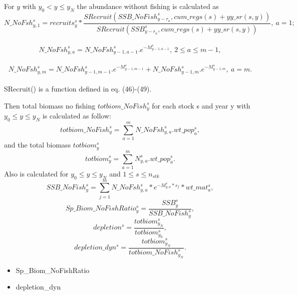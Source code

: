\documentclass{article}
\begin{document}
For $y$ with $y_0 < y \leq y_N$ the abundance without fishing is calculated as 
\\
\begin{equation}
    N\_NoFsh^s_{y,1}=recruits^s_y*\dfrac{SRecruit(SSB\_NoFish^s_{y-r_a},cum\_regs(s)+yy\_sr(s,y))}{SRecruit(SSB^s_{y-r_a},cum\_regs(s)+yy\_sr(s,y))}, \ a=1;
\end{equation}
\\
\begin{equation}
    N\_NoFsh^s_{y,a}=N\_NoFsh^s_{y-1,a-1}.e^{-M^s_{y-1, a-1}}, \ 2\leq a \leq m-1, 
\end{equation}
\\
\begin{equation}
    N\_NoFsh^s_{y,m}=N\_NoFsh^s_{y-1,m-1}.e^{-M^s_{y-1,m-1}}+N\_NoFsh^s_{y-1,m}.e^{-M^s_{y-1,m}}, \ a=m.
\end{equation}
\\
SRecruit() is a function defined in eq. (46)-(49).

Then total biomass no fishing  $totbiom\_NoFish^s_y$  for each stock s and year y with $y_0 \leq y \leq y_N$ is calculated as follow:
\begin{equation}
    totbiom\_NoFish^s_y=\sum_{a=1}^m N\_NoFsh^s_{y,a}.wt\_pop^s_a,
\end{equation}
and the total biomass $totbiom^s_y$ 
\begin{equation}
    totbiom^s_y=\sum_{a=1}^m N^s_{y,a}.wt\_pop^s_a.
\end{equation}
Also is calculated for $y_0 \leq y \leq y_N$ and $1\leq s \leq n_{stk}$
\begin{equation}
SSB\_NoFish^s_y=\sum_{j=1}^m N\_NoFsh^s_{y,a}*e^{-M^s_{y,a}*s_f}*wt\_mat^s_a,
\end{equation}
\begin{equation}
    Sp\_Biom\_NoFishRatio^s_y=\dfrac{SSB^s_y}{SSB\_NoFish^s_y},
\end{equation}
\begin{equation}
    depletion^s=\dfrac{totbiom^s_{y_N}}{totbiom^s_{y_0}},
\end{equation}
\begin{equation}
    depletion\_dyn^s=\dfrac{totbiom^s_{y_N}}{totbiom\_NoFish^s_{y_N}}.
\end{equation}
\begin{itemize}
    \item Sp\_Biom\_NoFishRatio
    \item depletion\_dyn
\end{itemize}
\end{document}

